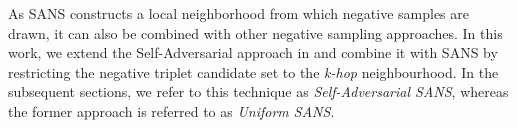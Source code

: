 As SANS constructs a local neighborhood from which negative samples are drawn, it can also be combined with other negative sampling approaches. In this work, we extend the Self-Adversarial approach in \cite{sun2019rotate} and combine it with SANS by restricting the negative triplet candidate set to the \emph{k-hop} neighbourhood. In the subsequent sections, we refer to this technique as \emph{Self-Adversarial SANS}, whereas the former approach is referred to as \emph{Uniform SANS}. 


